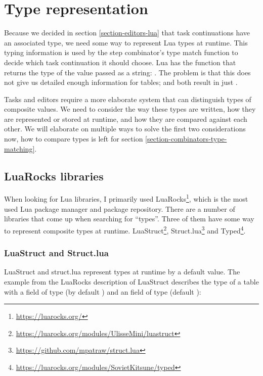 \section{Type representation}\label{section-type-representation}
Because we decided in section \ref{section-editors-lua} that task continuations have an associated type, we need some way to represent Lua types at runtime. This typing information is used by the step combinator's type match function to decide which task continuation it should choose.
Lua has the  function that returns the type of the value passed as a string: . The problem is that this does not give us detailed enough information for tables;  and  both result in just .

Tasks and editors require a more elaborate system that can distinguish types of composite values. We need to consider the way these types are written, how they are represented or stored at runtime, and how they are compared against each other. We will elaborate on multiple ways to solve the first two considerations now, how to compare types is left for section \ref{section-combinators-type-matching}.

\subsection{LuaRocks libraries}\label{section-task-types-luarocks}
When looking for Lua libraries, I primarily used LuaRocks\footnote{\label{footnote-luarocks}\url{https://luarocks.org/}}, which is the most used Lua package manager and package repository. There are a number of libraries that come up when searching for ``types''. Three of them have some way to represent composite types at runtime.
LuaStruct\footnote{\label{footnote-luastruct}\url{https://luarocks.org/modules/UlisseMini/luastruct}},
Struct.lua\footnote{\url{https://github.com/mpatraw/struct.lua}} and
Typed\footnote{\label{footnote-typed}\url{https://luarocks.org/modules/SovietKitsune/typed}}.

\subsubsection{LuaStruct and Struct.lua}
LuaStruct and struct.lua represent types at runtime by a default value. The example from the LuaRocks description of LuaStruct describes the type of a table with a  field of type  (by default ) and an  field of type  (default ):

